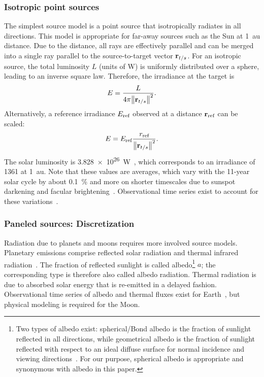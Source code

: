 \subsubsection{Isotropic point sources}
The simplest source model is a point source that isotropically radiates in all directions. This model is appropriate for far-away sources such as the Sun at \qty{1}{\astronomicalunit} distance. Due to the distance, all rays are effectively parallel and can be merged into a single ray parallel to the source-to-target vector $\vb r_{t/s}$. For an isotropic source, the total luminosity $L$ (units of \unit{\W}) is uniformly distributed over a sphere, leading to an inverse square law. Therefore, the irradiance at the target is
\begin{align}
    \label{eq:irradiance-point-luminosity}
    E = \frac{L}{4\pi\norm{\vb r_{t/s}}^2}.
\end{align}
Alternatively, a reference irradiance $E_\textnormal{ref}$ observed at a distance $\vb r_\textnormal{ref}$ can be scaled:
\begin{align}
    E = E_\textnormal{ref} \frac{r_\textnormal{ref}}{\norm{\vb r_{t/s}}^2}.
\end{align}
The solar luminosity is \qty{3.828e26}{\W}~\cite{Prsa2016}, which corresponds to an irradiance of \qty{1361}{\irr} at \qty{1}{\astronomicalunit}. Note that these values are averages, which vary with the 11-year solar cycle by about \qty{0.1}{\percent} and more on shorter timescales due to sunspot darkening and facular brightening~\cite{Kopp2016}. Observational time series exist to account for these variations~\cite{Dewitte2017}.

\subsubsection{Paneled sources: Discretization}
Radiation due to planets and moons requires more involved source models. Planetary emissions comprise reflected solar radiation and thermal infrared radiation~\cite{Knocke1988}. The fraction of reflected sunlight is called albedo\footnote{Two types of albedo exist: spherical/Bond albedo is the fraction of sunlight reflected in all directions, while geometrical albedo is the fraction of sunlight reflected with respect to an ideal diffuse surface for normal incidence and viewing directions~\cite{Heiken1991}. For our purpose, spherical albedo is appropriate and synonymous with albedo in this paper.} $a$; the corresponding type is therefore also called albedo radiation. Thermal radiation is due to absorbed solar energy that is re-emitted in a delayed fashion. Observational time series of albedo and thermal fluxes exist for Earth~\cite{Dewitte2017}, but physical modeling is required for the Moon.

